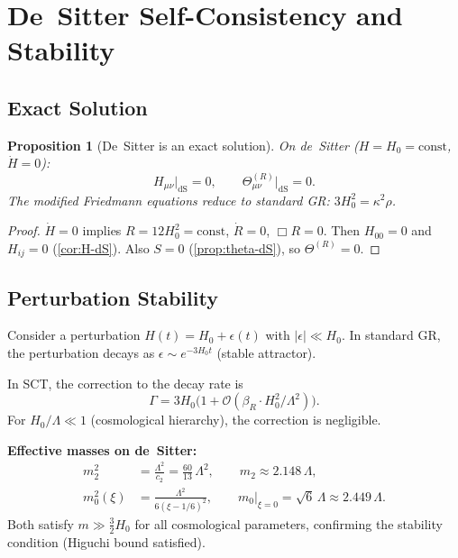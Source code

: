 \documentclass[11pt,a4paper]{article}
\theoremstyle{plain}
\newtheorem{proposition}[theorem]{Proposition}
\theoremstyle{definition}
\begin{document}
\section{De~Sitter Self-Consistency and Stability}\label{sec:dS}

\subsection{Exact Solution}

\begin{proposition}[De~Sitter is an exact solution]\label{prop:dS-exact}
On de~Sitter ($H = H_0 = \mathrm{const}$, $\dot{H} = 0$):
\begin{equation}\label{eq:dS-reduction}
  H_{\mu\nu}\big|_{\mathrm{dS}} = 0,
  \qquad
  \Theta^{(R)}_{\mu\nu}\big|_{\mathrm{dS}} = 0.
\end{equation}
The modified Friedmann equations reduce to standard GR:
$3H_0^2 = \kappa^2\rho$.
\end{proposition}

\begin{proof}
$\dot{H} = 0$ implies $R = 12H_0^2 = \text{const}$,
$\dot{R} = 0$, $\Box R = 0$.
Then $H_{00} = 0$ and $H_{ij} = 0$ (\cref{cor:H-dS}).
Also $S = 0$ (\cref{prop:theta-dS}), so $\Theta^{(R)} = 0$.
\end{proof}

\subsection{Perturbation Stability}

Consider a perturbation $H(t) = H_0 + \epsilon(t)$ with
$|\epsilon| \ll H_0$. In standard GR, the perturbation decays as
$\epsilon \sim e^{-3H_0 t}$ (stable attractor).

In SCT, the correction to the decay rate is
\begin{equation}\label{eq:decay-rate}
  \Gamma = 3H_0\bigl(1 + \mathcal{O}(\beta_R\cdot H_0^2/\Lambda^2)\bigr).
\end{equation}
For $H_0/\Lambda \ll 1$ (cosmological hierarchy), the correction is
negligible.

\textbf{Effective masses on de~Sitter:}
\begin{align}
  m_2^2 &= \frac{\Lambda^2}{c_2} = \frac{60}{13}\,\Lambda^2,
  \qquad m_2 \approx 2.148\,\Lambda,
  \label{eq:m2-dS}\\
  m_0^2(\xi) &= \frac{\Lambda^2}{6(\xi - 1/6)^2},
  \qquad m_0\big|_{\xi=0} = \sqrt{6}\,\Lambda \approx 2.449\,\Lambda.
  \label{eq:m0-dS}
\end{align}
Both satisfy $m \gg \frac{3}{2}H_0$ for all cosmological parameters,
confirming the stability condition (Higuchi bound satisfied).
\end{document}
